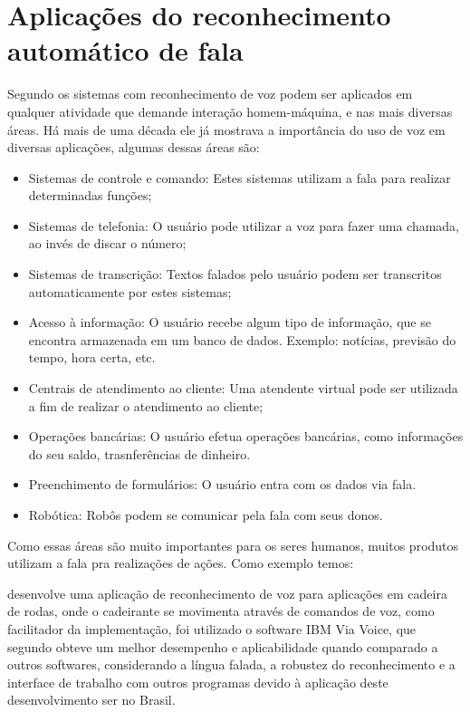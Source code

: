 \section{Aplicações do reconhecimento automático de fala}
Segundo  os sistemas com reconhecimento de voz podem ser aplicados em qualquer atividade que demande interação homem-máquina, e nas mais diversas áreas. Há mais de uma década ele já mostrava a importância do uso de voz em diversas aplicações, algumas dessas áreas são:

\begin{itemize}
\item Sistemas de controle e comando: Estes sistemas utilizam a fala para realizar
determinadas funções;
\item Sistemas de telefonia: O usuário pode utilizar a voz para fazer uma chamada, ao
invés de discar o número;
\item Sistemas de transcrição: Textos falados pelo usuário podem ser transcritos
automaticamente por estes sistemas;
\item Acesso à informação: O usuário recebe algum tipo de informação, que se encontra armazenada em um banco de dados. Exemplo: notícias, previsão do tempo, hora certa, etc.
\item Centrais de atendimento ao cliente: Uma atendente virtual pode ser utilizada a fim
de realizar o atendimento ao cliente;
\item Operações bancárias: O usuário efetua operações bancárias, como informações do seu saldo, trasnferências de dinheiro.
\item Preenchimento de formulários: O usuário entra com os dados via fala.
\item Robótica: Robôs podem se comunicar pela fala com seus donos.

\end{itemize}

Como essas áreas são muito importantes para os seres humanos, muitos produtos utilizam a fala pra realizações de ações. Como exemplo temos:

 desenvolve uma aplicação de reconhecimento de voz para aplicações em cadeira de rodas, onde o cadeirante se movimenta através de comandos de voz, como facilitador da implementação, foi utilizado o software IBM Via Voice, que segundo  obteve um melhor desempenho e aplicabilidade quando comparado a outros softwares, considerando a língua falada, a robustez do reconhecimento e a interface de trabalho com outros programas devido à aplicação deste desenvolvimento ser no Brasil.

